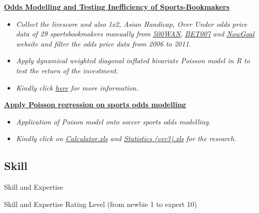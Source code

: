 \documentclass[]{article}
\providecommand{\tightlist}{%
  \setlength{\itemsep}{0pt}\setlength{\parskip}{0pt}}
\begin{document}
\href{https://github.com/scibrokes/odds-modelling-and-testing-inefficiency-of-sports-bookmakers}{\textbf{Odds
Modelling and Testing Inefficiency of Sports-Bookmakers}}

\begin{itemize}
\tightlist
\item
  \emph{Collect the livescore and also 1x2, Asian Handicap, Over Under
  odds price data of 29 sportsbookmakers manually from}
  \href{http://www.500wan.com}{\emph{500WAN}},
  \href{http://www.bet007.com}{\emph{BET007}} \emph{and}
  \href{http://info.nowgoal.com/en/}{\emph{NowGoal}} \emph{website and
  filter the odds price data from 2006 to 2011.}
\item
  \emph{Apply dynamical weighted diagonal inflated bivariate Poisson
  model in R to test the return of the investment.}
\item
  \emph{Kindly click
  \href{https://github.com/scibrokes/odds-modelling-and-testing-inefficiency-of-sports-bookmakers}{here}
  for more information.}
\end{itemize}

\href{https://www.dropbox.com/sh/h3e6gv59onz311j/AAAFcfFOfon-kEhveTzvHGHza?dl=0}{\textbf{Apply
Poisson regression on sports odds modelling}}

\begin{itemize}
\tightlist
\item
  \emph{Application of Poison model onto soccer sports odds modelling.}
\item
  \emph{Kindly click on
  \href{https://github.com/scibrokes/owner/blob/master/data/Calculator.xls}{Calculator.xls}
  and
  \href{https://github.com/scibrokes/owner/blob/master/data/Statistics\%20(ver3).xls}{Statistics
  (ver3).xls} for the research.}
\end{itemize}

\subsection{Skill}\label{skill}

Skill and Expertise

Skill and Expertise Rating Level (from newbie 1 to expert 10)

\hypertarget{htmlwidget-9b4f2ba90894d7bf44fd}{}
\end{document}
